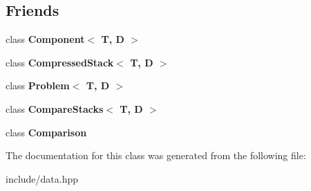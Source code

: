 \subsection*{Friends}
\begin{DoxyCompactItemize}
\item 
class {\bfseries Component$<$ T, D $>$}\hypertarget{class_data_a843c2f068a1ab99ce6c9c0e2cc3946c5}{}\label{class_data_a843c2f068a1ab99ce6c9c0e2cc3946c5}

\item 
class {\bfseries Compressed\+Stack$<$ T, D $>$}\hypertarget{class_data_a0bc563c952d4b72ba232305ab7717bd9}{}\label{class_data_a0bc563c952d4b72ba232305ab7717bd9}

\item 
class {\bfseries Problem$<$ T, D $>$}\hypertarget{class_data_a49d2c5c1103bce3a8ba02241be7f15c0}{}\label{class_data_a49d2c5c1103bce3a8ba02241be7f15c0}

\item 
class {\bfseries Compare\+Stacks$<$ T, D $>$}\hypertarget{class_data_aad0b6ceccdc6599793a7e2e5798b59ad}{}\label{class_data_aad0b6ceccdc6599793a7e2e5798b59ad}

\item 
class {\bfseries Comparison}\hypertarget{class_data_aef3aa9a02bb7e4bcae2ebd8975a9206d}{}\label{class_data_aef3aa9a02bb7e4bcae2ebd8975a9206d}

\end{DoxyCompactItemize}


The documentation for this class was generated from the following file\+:\begin{DoxyCompactItemize}
\item 
include/data.\+hpp\end{DoxyCompactItemize}
